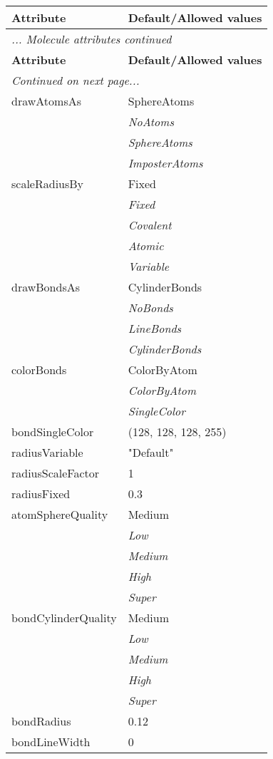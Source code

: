 \documentclass[10pt,a4paper]{report}
\begin{document}
\begin{longtable}{ll}
{\bf Attribute} & {\bf Default/Allowed values} \\
\hline \hline
\endfirsthead
\multicolumn{2}{l}{{\it ... Molecule attributes continued}} \\
{\bf Attribute} & {\bf Default/Allowed values} \\
\hline \hline
\endhead
\hline
\multicolumn{2}{l}{{\it Continued on next page...}} \\
\endfoot
\hline
\endlastfoot

drawAtomsAs  &  SphereAtoms   \\
 & {\it  NoAtoms} \\
 & {\it  SphereAtoms} \\
 & {\it  ImposterAtoms} \\
scaleRadiusBy  &  Fixed   \\
 & {\it  Fixed} \\
 & {\it  Covalent} \\
 & {\it  Atomic} \\
 & {\it  Variable} \\
drawBondsAs  &  CylinderBonds   \\
 & {\it  NoBonds} \\
 & {\it  LineBonds} \\
 & {\it  CylinderBonds} \\
colorBonds  &  ColorByAtom   \\
 & {\it  ColorByAtom} \\
 & {\it  SingleColor} \\
bondSingleColor  &  (128, 128, 128, 255) \\
radiusVariable  &  "Default" \\
radiusScaleFactor  &  1 \\
radiusFixed  &  0.3 \\
atomSphereQuality  &  Medium   \\
 & {\it  Low} \\
 & {\it  Medium} \\
 & {\it  High} \\
 & {\it  Super} \\
bondCylinderQuality  &  Medium   \\
 & {\it  Low} \\
 & {\it  Medium} \\
 & {\it  High} \\
 & {\it  Super} \\
bondRadius  &  0.12 \\
bondLineWidth  &  0 \\

\end{longtable}
\end{document}
